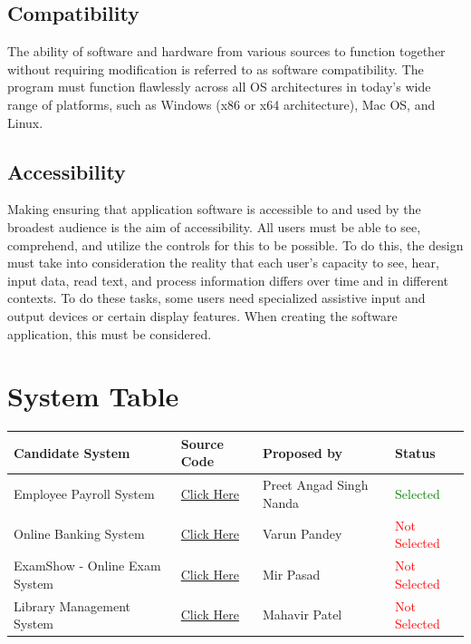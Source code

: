 \documentclass[12pt,english]{article}
\begin{document}
    \subsection{Compatibility}
    The ability of software and hardware from various sources to function together without requiring modification is referred to as software compatibility. The program must function flawlessly across all OS architectures in today's wide range of platforms, such as Windows (x86 or x64 architecture), Mac OS, and Linux.
    \subsection{Accessibility}
    Making ensuring that application software is accessible to and used by the broadest audience is the aim of accessibility. All users must be able to see, comprehend, and utilize the controls for this to be possible. To do this, the design must take into consideration the reality that each user's capacity to see, hear, input data, read text, and process information differs over time and in different contexts. To do these tasks, some users need specialized assistive input and output devices or certain display features. When creating the software application, this must be considered.
\newpage

\section{System Table}

    \begin{tabularx}{1\textwidth} { 
      | >{\raggedright\arraybackslash}X 
      | >{\raggedright\arraybackslash}X 
      | >{\raggedright\arraybackslash}X 
      | >{\raggedright\arraybackslash}X |
        }
     \hline
     Candidate System & Source Code & Proposed by & Status\\
     \hline
     Employee Payroll System  & \href{https://github.com/cerebrus-sys/Employee-Payroll-System}{Click Here} & Preet Angad Singh Nanda & \textcolor{green}{Selected} \\
    \hline
    Online Banking System  & \href{https://github.com/ryhan000/Online-Banking-System}{Click Here} & Varun Pandey & \textcolor{red}{Not Selected} \\
    \hline
    ExamShow - Online Exam System  & \href{https://github.com/pankaj9310/examshow}{Click Here} & Mir Pasad & \textcolor{red}{Not Selected} \\
    \hline
    Library Management System  & \href{https://github.com/minaahilimtiaz/Library-Management-System-Java}{Click Here} & Mahavir Patel & \textcolor{red}{Not Selected} \\
    \hline
    \end{tabularx}
\end{document}
